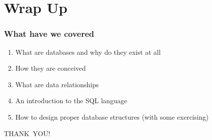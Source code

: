 \documentclass[\printmode,compress,xcolor=dvipsnames]{beamer}
\begin{document}

\section{Wrap Up}

\begin{frame}
	\frametitle<+->{What have we covered}

  \begin{enumerate}[<+- | alert@+->]

    \item What are databases and why do they exist at all

    \item How they are conceived

		\item What are data relationships

		\item An introduction to the SQL language

		\item How to design proper database structures (with some exercising)

  \end{enumerate}

\end{frame}

\begin{frame}

	\begin{center}
	\begin{Huge}
		\alert{THANK\ YOU!}
	\end{Huge}
	\end{center}

\end{frame}
\end{document}
